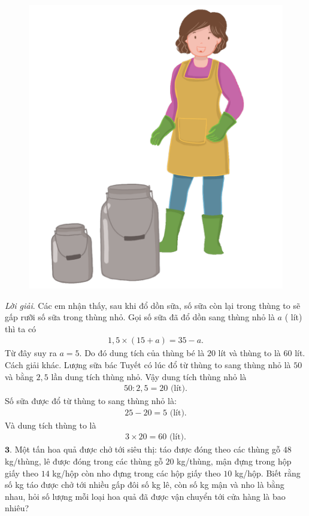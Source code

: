 \begin{multicols}{2}
\begin{figure}[H]
	 	\centering
	 	\vspace*{5pt}
	 	\captionsetup{labelformat= empty, justification=centering}
	 	\includegraphics[width=0.75\linewidth]{Pi3_bai2}
	 	\vspace*{-5pt}
	 \end{figure}
	\textit{Lời giải}. Các em nhận thấy, sau khi đổ dồn sữa, số sữa còn lại trong thùng to sẽ gấp rưỡi số sữa trong thùng nhỏ. Gọi số sữa đã đổ dồn sang thùng nhỏ là $a$ ( lít) thì ta có 
	\begin{align*}
		1{,}5\times (15+a)=35-a.
	\end{align*}
	Từ đây suy ra $a =5$. Do đó dung tích của thùng bé là $20$ lít và thùng to là $60$ lít.
	\vskip 0.1cm
	Cách giải khác. Lượng sữa bác Tuyết có lúc đổ từ thùng to sang thùng nhỏ là $50$ và bằng $2{,}5$ lần dung tích thùng nhỏ. Vậy dung tích thùng nhỏ là 
	\begin{align*}
		50: 2{,}5  = 20 \text{ (lít).} 
	\end{align*}
	Số sữa được đổ từ thùng to sang thùng nhỏ là: 
	\begin{align*}
		25-20=5 \text{ (lít).} 
	\end{align*}
	Và dung tích thùng to là 
	\begin{align*}
		3 \times 20=60 \text{ (lít).}
	\end{align*}
	$\pmb{3.}$ Một tấn hoa quả được chở tới siêu thị: táo được đóng theo các thùng gỗ  $48$ kg/thùng, lê được đóng trong các thùng gỗ $20$ kg/thùng, mận đựng trong hộp giấy theo $14$ kg/hộp còn nho đựng trong các hộp giấy theo $10$ kg/hộp. Biết rằng số kg táo được chở tới nhiều gấp đôi số kg lê, còn số kg mận và nho là bằng nhau, hỏi số lượng mỗi loại hoa quả đã được vận chuyển tới cửa hàng là bao nhiêu?

\end{multicols}
